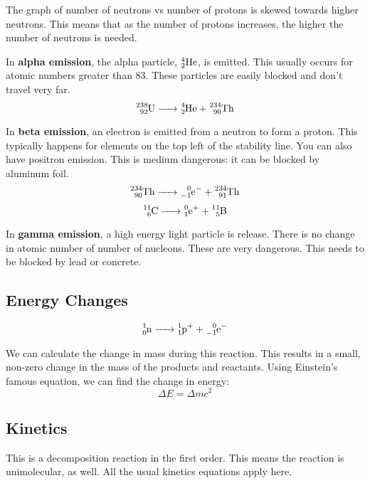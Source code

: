 \documentclass{article}
\begin{document}
The graph of number of neutrons vs number of protons is skewed towards higher
neutrons. This means that as the number of protons increases, the higher the
number of neutrons is needed.

In \textbf{alpha emission}, the alpha particle, ${}_{2}^{4}\ce{He}$, is emitted.
This usually occurs for atomic numbers greater than 83. These particles are
easily blocked and don't travel very far.
$$ \ce{{}_{92}^{238}U -> {}_{2}^{4}He + {}_{90}^{234}Th} $$

In \textbf{beta emission}, an electron is emitted from a neutron to form a
proton. This typically happens for elements on the top left of the stability
line. You can also have positron emission. This is medium dangerous: it can be
blocked by aluminum foil.
$$ \ce{{}^{234}_{90}Th -> {}_{-1}^{0}e^{-} + {}_{91}^{234}Th} $$
$$  \ce{{}^{11}_{6}C -> {}_{1}^{0}e^{+} + {}^{11}_{5}B } $$

In \textbf{gamma emission}, a high energy light particle is release. There is no
change in atomic number of number of nucleons. These are very dangerous. This
needs to be blocked by lead or concrete.

\subsection{Energy Changes}
$$ \ce{{}^{1}_{0}n -> {}^{1}_{1}p^{+} + {}_{-1}^{0}e^{-} } $$

We can calculate the change in mass during this reaction. This results in a
small, non-zero change in the mass of the products and reactants. Using
Einstein's famous equation, we can find the change in energy:
$$ \Delta E = \Delta m c^{2} $$

\subsection{Kinetics}

This is a decomposition reaction in the first order. This means the reaction is
unimolecular, as well. All the usual kinetics equations apply here.
\end{document}
